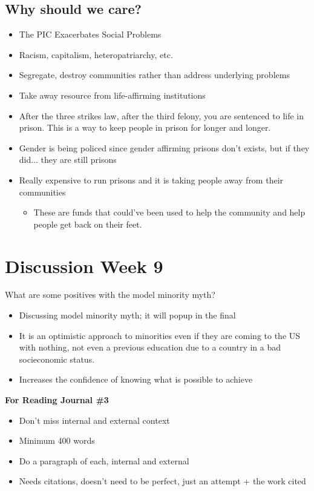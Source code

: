 \documentclass{article}
\begin{document}
\subsection{Why should we care?}
\begin{itemize}
  \item The PIC Exacerbates Social Problems
  \item Racism, capitalism, heteropatriarchy, etc.
  \item Segregate, destroy communities rather than address underlying problems
  \item Take away resource from life-affirming institutions
  \item After the three strikes law, after the third felony, you are sentenced to life in prison.
    This is a way to keep people in prison for longer and longer.
  \item Gender is being policed since gender affirming prisons don't exists,
    but if they did... they are still prisons
  \item Really expensive to run prisons and it is taking people away from their communities
    \begin{itemize}
  \item These are funds that could've been used to help the community
    and help people get back on their feet.
    \end{itemize}
\end{itemize}

\section*{Discussion Week 9}

What are some positives with the model minority myth?

\begin{itemize}
  \item Discussing model minority myth; it will popup in the final
  \item It is an optimistic approach to minorities even if they are
    coming to the US with nothing, not even a previous education due to
    a country in a bad socieconomic status.
  \item Increases the confidence of knowing what is possible to achieve
\end{itemize}


\noindent
\textbf{For Reading Journal \#3}
\begin{itemize}
  \item Don't miss internal and external context
  \item Minimum 400 words
  \item Do a paragraph of each, internal and external
  \item Needs citations, doesn't need to be perfect, just an attempt
    + the work cited
\end{itemize}
\end{document}
